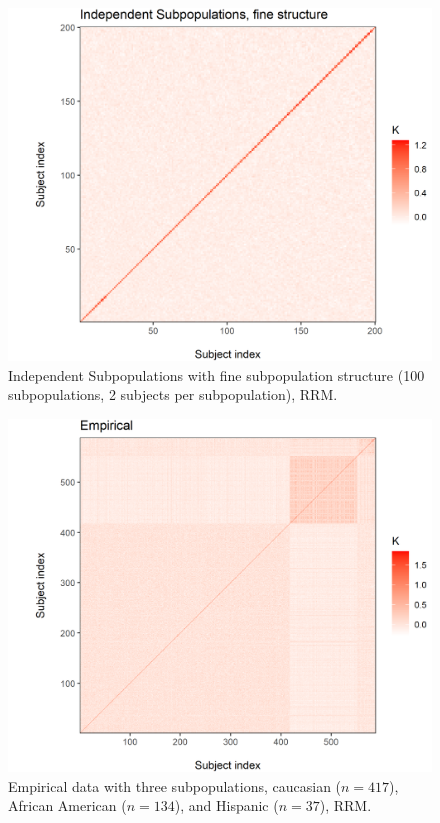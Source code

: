 \begin{figure}[H]
    \centering
    \includegraphics[scale = 1]{figures/indep_fine_kinship.png}
    \caption{Independent Subpopulations with fine subpopulation structure (100 subpopulations, 2 subjects per subpopulation), RRM.}
    \label{fig:indep_fine}
\end{figure}

\begin{figure}[H]
    \centering
    \includegraphics[scale = 1]{figures/empirical_kinship.png}
    \caption{Empirical data with three subpopulations, caucasian ($n = 417$), African American ($n = 134$), and Hispanic ($n = 37$), RRM.}
    \label{fig:empirical}
\end{figure}

